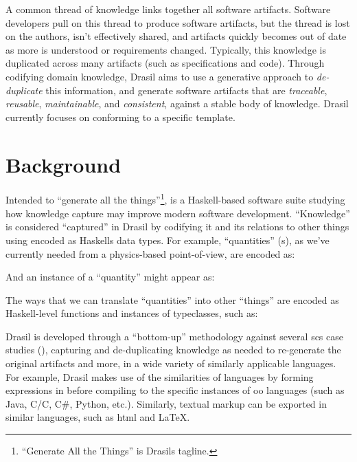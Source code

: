       A common thread of knowledge links together all software artifacts.
      Software developers pull on this thread to produce software artifacts, but
      the thread is lost on the authors, isn't effectively shared, and artifacts
      quickly becomes out of date as more is understood or requirements changed.
      Typically, this knowledge is duplicated across many artifacts (such as
      specifications and code). Through codifying domain knowledge,
      Drasil\cite{Drasil2021} aims to use a generative approach to
      \textit{de-duplicate} this information, and generate software artifacts
      that are \textit{traceable}, \textit{reusable}, \textit{maintainable}, and
      \textit{consistent}, against a stable body of knowledge. Drasil currently
      focuses on  conforming to a specific 
      template\cite{SmithAndLai2005}.
\fi

\section{Background}
\label{sec:intro:background}


Intended to ``generate all the things''\footnote{``Generate All the Things'' is
      Drasils tagline.},
 is a
Haskell-based \cite{Haskell2010} software suite studying how knowledge
capture may improve modern software development. ``Knowledge'' is
considered ``captured'' in Drasil by codifying it and its relations to
other things using  encoded as Haskells data types. For example,
``quantities'' (\QuantityDict{}s), as we've currently needed from a
physics-based point-of-view, are encoded as:

\originalQuantityDictHaskell{}

And an instance of a ``quantity'' might appear as:\\

\originalQuantityDictExampleHaskell{}

The ways that we can translate ``quantities'' into other ``things'' are encoded
as Haskell-level functions and instances of typeclasses, such as:


Drasil is developed through a ``bottom-up'' methodology against several
\acs{scs} case studies (), capturing and de-duplicating
knowledge as needed to re-generate the original artifacts and more, in a wide
variety of similarly applicable languages. For example, Drasil makes use of the
similarities of  languages by forming expressions in  before
compiling to the specific instances of \acs{oo} languages (such as Java,
C/C\+\+, C\#, Python, etc.). Similarly, textual markup can be exported in
similar languages, such as \acs{html} and \LaTeX{}.

